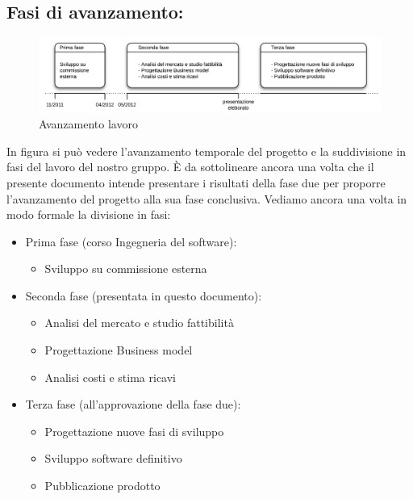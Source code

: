 \subsection{Fasi di avanzamento:}

\begin{figure}[H]
\centering
\includegraphics[scale=0.6]{images/Avanzamento.png}
\caption{Avanzamento lavoro}
\end{figure}

In figura  si può vedere l'avanzamento temporale del progetto e la suddivisione in fasi del lavoro del nostro gruppo. È da sottolineare ancora una volta che il presente documento intende presentare i risultati della fase due per proporre l'avanzamento del progetto alla sua fase conclusiva. Vediamo ancora una volta in modo formale la divisione in fasi: 

\begin{itemize}
\item Prima fase (corso Ingegneria del software):
\begin{itemize}
\item Sviluppo su commissione esterna 
\end{itemize}
\end{itemize}

\begin{itemize}
\item Seconda fase (presentata in questo documento):
\begin{itemize}
\item Analisi del mercato e studio fattibilità
\item Progettazione Business model
\item Analisi costi e stima ricavi
\end{itemize}
\end{itemize}

\begin{itemize}
\item Terza fase (all'approvazione della fase due):
\begin{itemize}
\item Progettazione nuove fasi di sviluppo
\item Sviluppo software definitivo
\item Pubblicazione prodotto
\end{itemize}
\end{itemize}

